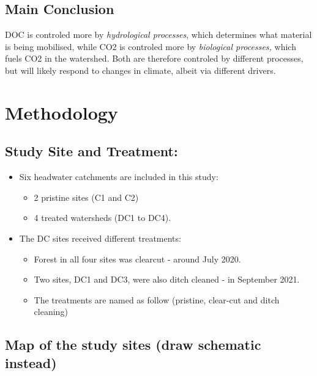 \documentclass[
  letterpaper,
  DIV=11,
  numbers=noendperiod]{scrartcl}
\begin{document}
\subsection{Main Conclusion}\label{main-conclusion}

DOC is controled more by \emph{hydrological processes}, which determines
what material is being mobilised, while CO2 is controled more by
\emph{biological processes,} which fuels CO2 in the watershed. Both are
therefore controled by different processes, but will likely respond to
changes in climate, albeit via different drivers.

\section{Methodology}\label{methodology}

\subsection{Study Site and Treatment:}\label{study-site-and-treatment}

\begin{itemize}
\item
  Six headwater catchments are included in this study:

  \begin{itemize}
  \item
    2 pristine sites (C1 and C2)
  \item
    4 treated watersheds (DC1 to DC4).
  \end{itemize}
\item
  The DC sites received different treatments:

  \begin{itemize}
  \item
    Forest in all four sites was clearcut - around July 2020.
  \item
    Two sites, DC1 and DC3, were also ditch cleaned - in September 2021.
  \item
    The treatments are named as follow (pristine, clear-cut and ditch
    cleaning)
  \end{itemize}
\end{itemize}

\subsection{Map of the study sites (draw schematic
instead)}\label{map-of-the-study-sites-draw-schematic-instead}
\end{document}

